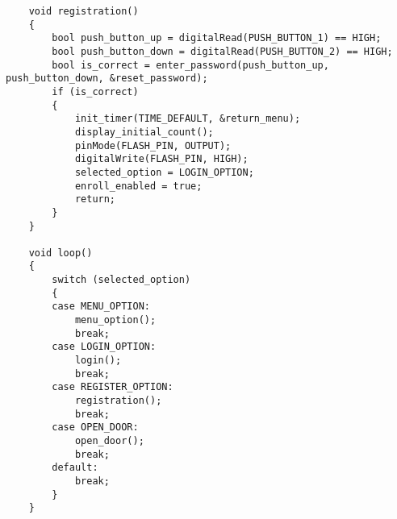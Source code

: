 \begin{Spacing}{1}
\begin{lstlisting}
	void registration()
	{
		bool push_button_up = digitalRead(PUSH_BUTTON_1) == HIGH;
		bool push_button_down = digitalRead(PUSH_BUTTON_2) == HIGH;
		bool is_correct = enter_password(push_button_up, push_button_down, &reset_password);
		if (is_correct)
		{
			init_timer(TIME_DEFAULT, &return_menu);
			display_initial_count();
			pinMode(FLASH_PIN, OUTPUT);
			digitalWrite(FLASH_PIN, HIGH);
			selected_option = LOGIN_OPTION;
			enroll_enabled = true;
			return;
		}
	}
	
	void loop()
	{
		switch (selected_option)
		{
		case MENU_OPTION:
			menu_option();
			break;
		case LOGIN_OPTION:
			login();
			break;
		case REGISTER_OPTION:
			registration();
			break;
		case OPEN_DOOR:
			open_door();
			break;
		default:
			break;
		}
	}
\end{lstlisting}
\end{Spacing}
